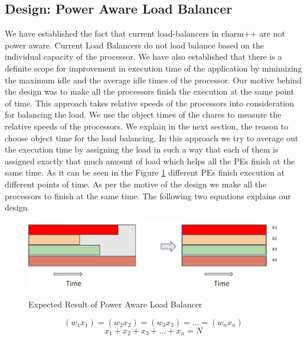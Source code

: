 \subsection{Design: Power Aware Load Balancer}
We have established the fact that current load-balancers in charm++ are not
power aware. Current Load Balancers do not load balance based on the
individual capacity of the processor. We have also established that there is a
definite scope for improvement in execution time of the application by
minimizing the maximum idle and the average idle times of the processor.
Our motive behind the design was to make all the processors finish the
execution at the same point of time. This approach takes relative speeds of the
processors into consideration for balancing the load. We use the object times
of the chares to measure the relative speeds of the processors. We explain in
the next section, the reason to choose object time for the load balancing.  In
this approach we try to average out the execution time by assigning the load in
such a way that each of them is assigned exactly that much amount of load which
helps all the PEs finish at the same time. As it can be seen in the
Figure \ref{fig:ideal} different PEs finish execution at different points of time. As per the
motive of the design we make all the processors to finish at the same time. The
following two equations explains our design.  

\begin{figure}
\centering
\scalebox{.40} {
\includegraphics[scale=0.8]{Jacobi/EPS/time_diff.eps}
}
\caption{Expected Result of Power Aware Load Balancer}
\label{fig:ideal}
\end{figure}

    \begin{equation} \label{eq:3}
      (w_1x_1) = (w_2x_2) = (w_3x_3) = \dots = (w_nx_n) 
    \end{equation}
    \begin{equation} \label{eq:4}
      x_1 + x_2 + x_3 + \dots + x_n = N
    \end{equation}

